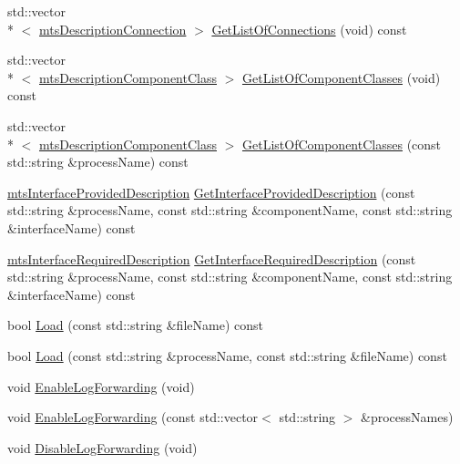 \begin{DoxyCompactItemize}
\item 
std\-::vector\\*
$<$ \hyperlink{classmts_description_connection}{mts\-Description\-Connection} $>$ \hyperlink{classmts_manager_component_services_a758b2e80128800532561668d67ad1a1d}{Get\-List\-Of\-Connections} (void) const 
\item 
std\-::vector\\*
$<$ \hyperlink{classmts_description_component_class}{mts\-Description\-Component\-Class} $>$ \hyperlink{classmts_manager_component_services_a1ec4b1157dfab6f371d7247a1c736dc5}{Get\-List\-Of\-Component\-Classes} (void) const 
\item 
std\-::vector\\*
$<$ \hyperlink{classmts_description_component_class}{mts\-Description\-Component\-Class} $>$ \hyperlink{classmts_manager_component_services_a50b91497aea42ceed34ce0366b33544b}{Get\-List\-Of\-Component\-Classes} (const std\-::string \&process\-Name) const 
\item 
\hyperlink{classmts_interface_provided_description}{mts\-Interface\-Provided\-Description} \hyperlink{classmts_manager_component_services_af3e386364e4724619500f756aee841d3}{Get\-Interface\-Provided\-Description} (const std\-::string \&process\-Name, const std\-::string \&component\-Name, const std\-::string \&interface\-Name) const 
\item 
\hyperlink{classmts_interface_required_description}{mts\-Interface\-Required\-Description} \hyperlink{classmts_manager_component_services_a2a886ede498b63f0b9e7feebc61515a3}{Get\-Interface\-Required\-Description} (const std\-::string \&process\-Name, const std\-::string \&component\-Name, const std\-::string \&interface\-Name) const 
\item 
bool \hyperlink{classmts_manager_component_services_a3bd5a6fb204dc6634492a017826ac4d6}{Load} (const std\-::string \&file\-Name) const 
\item 
bool \hyperlink{classmts_manager_component_services_a810f37fd41bfa13aed6d529fc796c7ac}{Load} (const std\-::string \&process\-Name, const std\-::string \&file\-Name) const 
\item 
void \hyperlink{classmts_manager_component_services_a87f252282b2fca758264f3969fbc387a}{Enable\-Log\-Forwarding} (void)
\item 
void \hyperlink{classmts_manager_component_services_a53e074ce13e3a76f307307760b24d204}{Enable\-Log\-Forwarding} (const std\-::vector$<$ std\-::string $>$ \&process\-Names)
\item 
void \hyperlink{classmts_manager_component_services_aab3395d819330f83b23e7d92b3e5c3ed}{Disable\-Log\-Forwarding} (void)

\end{DoxyCompactItemize}
